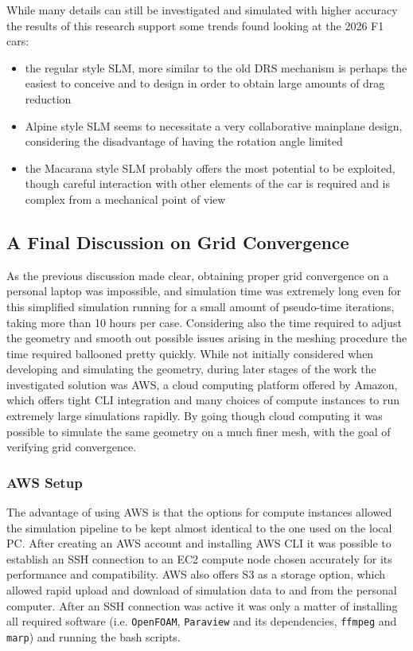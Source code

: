 \documentclass[12pt,a4paper]{article}
\begin{document}
While many details can still be investigated and simulated with higher accuracy the results of this research support some trends found looking at the 2026 F1 cars:

\begin{itemize}
    \item the regular style SLM, more similar to the old DRS mechanism is perhaps the easiest to conceive and to design in order to obtain large amounts of drag reduction
    \item Alpine style SLM seems to necessitate a very collaborative mainplane design, considering the disadvantage of having the rotation angle limited
    \item the Macarana style SLM probably offers the most potential to be exploited, though careful interaction with other elements of the car is required and is complex from a mechanical point of view
\end{itemize}

\subsection{A Final Discussion on Grid Convergence}
As the previous discussion made clear, obtaining proper grid convergence on a personal laptop was impossible, and simulation time was extremely long even for this simplified simulation running for a small amount of pseudo-time iterations, taking more than 10 hours per case. Considering also the time required to adjust the geometry and smooth out possible issues arising in the meshing procedure the time required ballooned pretty quickly. While not initially considered when developing and simulating the geometry, during later stages of the work the investigated solution was AWS, a cloud computing platform offered by Amazon, which offers tight CLI integration and many choices of compute instances to run extremely large simulations rapidly. By going though cloud computing it was possible to simulate the same geometry on a much finer mesh, with the goal of verifying grid convergence.

\subsubsection{AWS Setup}
The advantage of using AWS is that the options for compute instances allowed the simulation pipeline to be kept almost identical to the one used on the local PC. After creating an AWS account and installing AWS CLI it was possible to establish an SSH connection to an EC2 compute node chosen accurately for its performance and compatibility. AWS also offers S3 as a storage option, which allowed rapid upload and download of simulation data to and from the personal computer. After an SSH connection was active it was only a matter of installing all required software (i.e. \texttt{OpenFOAM}, \texttt{Paraview} and its dependencies, \texttt{ffmpeg} and \texttt{marp}) and running the bash scripts.
\end{document}
